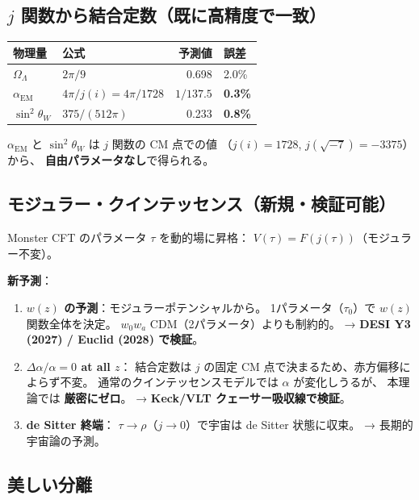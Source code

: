 \documentclass[11pt,a4paper]{article}
\begin{document}
\subsection{$j$ 関数から結合定数（既に高精度で一致）}

\begin{center}
\begin{tabular}{llrl}
\toprule
物理量 & 公式 & 予測値 & 誤差 \\
\midrule
$\Omega_\Lambda$ & $2\pi/9$ & 0.698 & 2.0\% \\
$\alpha_{\mathrm{EM}}$ & $4\pi/j(i) = 4\pi/1728$ & $1/137.5$ & \textbf{0.3\%} \\
$\sin^2\theta_W$ & $375/(512\pi)$ & 0.233 & \textbf{0.8\%} \\
\bottomrule
\end{tabular}
\end{center}

$\alpha_{\mathrm{EM}}$ と $\sin^2\theta_W$ は $j$ 関数の CM 点での値
（$j(i) = 1728$, $j(\sqrt{-7}) = -3375$）から、
\textbf{自由パラメータなし}で得られる。

\subsection{モジュラー・クインテッセンス（新規・検証可能）}

Monster CFT のパラメータ $\tau$ を動的場に昇格：
$V(\tau) = F(j(\tau))$（モジュラー不変）。

\textbf{新予測}：
\begin{enumerate}
\item \textbf{$w(z)$ の予測}：モジュラーポテンシャルから。
  1パラメータ（$\tau_0$）で $w(z)$ 関数全体を決定。
  $w_0 w_a$ CDM（2パラメータ）よりも制約的。
  → \textbf{DESI Y3 (2027) / Euclid (2028) で検証}。

\item \textbf{$\Delta\alpha/\alpha = 0$ at all $z$}：
  結合定数は $j$ の固定 CM 点で決まるため、赤方偏移によらず不変。
  通常のクインテッセンスモデルでは $\alpha$ が変化しうるが、
  本理論では \textbf{厳密にゼロ}。
  → \textbf{Keck/VLT クェーサー吸収線で検証}。

\item \textbf{de Sitter 終端}：
  $\tau \to \rho$（$j \to 0$）で宇宙は de Sitter 状態に収束。
  → 長期的宇宙論の予測。
\end{enumerate}

\subsection{美しい分離}
\end{document}
